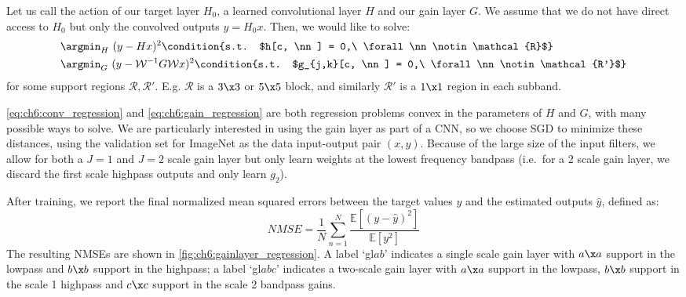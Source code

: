 Let us call the action of our target layer $H_0$, a learned convolutional layer $H$
and our gain layer $G$.
We assume that we do not have direct
access to $H_0$ but only the convolved outputs $y=H_0 x$. Then, we would like to solve:
\begin{align}
  & \argmin_{H}\ (y - Hx)^2 %
  \condition{s.t. $h[c, \nn] = 0,\ \forall \nn \notin \mathcal{R}$} \label{eq:ch6:conv_regression}\\
  & \argmin_{G}\ (y - \mathcal{W}^{-1}G\mathcal{W}x)^2 %
  \condition{s.t. $g_{j,k}[c, \nn] = 0,\ \forall \nn \notin \mathcal{R'}$} \label{eq:ch6:gain_regression}
\end{align}
for some support regions $\mathcal{R},\mathcal{R'}$. E.g. $\mathcal{R}$ is a $3\x3$ or $5\x5$
block, and similarly $\mathcal{R'}$ is a $1\x 1$ region in each
subband.

\eqref{eq:ch6:conv_regression} and \eqref{eq:ch6:gain_regression} are both
regression problems convex in the parameters of $H$ and $G$, with many possible
ways to solve. We are particularly interested in using the gain layer as part of
a CNN, so we choose SGD to minimize these distances,
using the validation set for ImageNet as the data input-output pair $(x, y)$.
Because of the large size of the input filters, we allow for both a $J=1$ and
$J=2$ scale gain layer but only learn weights at the lowest frequency bandpass
(i.e.\ for a 2 scale gain layer, we discard the first scale highpass outputs and
only learn $g_2$).

After training, we report the final normalized mean squared errors between the
target values $y$ and the estimated outputs $\hat{y}$, defined as:
\begin{equation}
  NMSE = \frac{1}{N} \sum_{n=1}^N \frac{\mathbb{E}\left[(y-\hat{y})^2\right]}{\mathbb{E}\left[y^2\right]}
\end{equation}
The resulting NMSEs are shown in \autoref{fig:ch6:gainlayer_regression}. A label
`gl$ab$' indicates a single scale gain layer with $a\x a$ support in the lowpass
and $b\x b$ support in the highpass; a label `gl$abc$' indicates a two-scale
gain layer with $a\x a$ support in the lowpass, $b\x b$ support in the scale 1
highpass and $c\x c$ support in the scale 2 bandpass gains.

